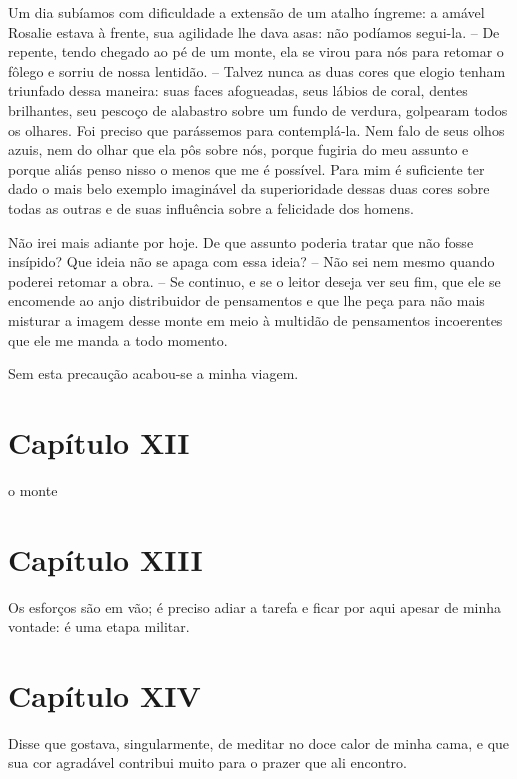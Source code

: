  Um dia subíamos com dificuldade a extensão de um atalho íngreme: a
amável Rosalie estava à frente, sua agilidade lhe dava asas: não
podíamos segui-la. -- De repente, tendo chegado ao pé de um monte, ela
se virou para nós para retomar o fôlego e sorriu de nossa lentidão. --
Talvez nunca as duas cores que elogio tenham triunfado dessa maneira:
suas faces afogueadas, seus lábios de coral, dentes brilhantes, seu
pescoço de alabastro sobre um fundo de verdura, golpearam todos os
olhares. Foi preciso que parássemos para contemplá-la. Nem falo de seus
olhos azuis, nem do olhar que ela pôs sobre nós, porque fugiria do meu
assunto e porque aliás penso nisso o menos que me é possível. Para mim
é suficiente ter dado o mais belo exemplo imaginável da superioridade
dessas duas cores sobre todas as outras e de suas influência sobre a
felicidade dos homens.

 Não irei mais adiante por hoje. De que assunto poderia tratar que não
fosse insípido? Que ideia não se apaga com essa ideia? -- Não sei nem
mesmo quando poderei retomar a obra. -- Se continuo, e se o leitor
deseja ver seu fim, que ele se encomende ao anjo distribuidor de
pensamentos e que lhe peça para não mais misturar a imagem desse monte
em meio à multidão de pensamentos incoerentes que ele me manda a todo
momento. 

 Sem esta precaução acabou-se a minha viagem.

\section*{Capítulo XII}

\noindent\dotfill

\noindent o monte

\noindent\dotfill

\section*{Capítulo XIII}

 Os esforços são em vão; é preciso adiar a tarefa e ficar por aqui
apesar de minha vontade: é uma etapa militar.

\section*{Capítulo XIV}

Disse que gostava, singularmente, de meditar no doce calor de minha
cama, e que sua cor agradável contribui muito para o prazer que ali
encontro.

